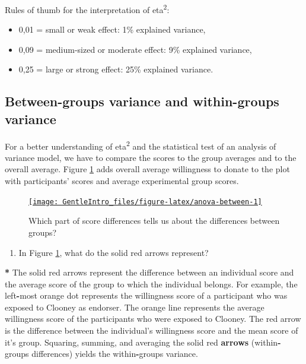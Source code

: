 \documentclass[a4paper]{book}
\newenvironment{Shaded}{\begin{snugshade}}{\end{snugshade}}
\newcommand{\KeywordTok}[1]{\textcolor[rgb]{0,0,0}{\textbf{#1}}}
\newcommand{\StringTok}[1]{\textcolor[rgb]{0.00,0.00,0.00}{#1}}
\newcommand{\OperatorTok}[1]{\textcolor[rgb]{0.00,0.00,0.00}{\textbf{#1}}}
\newcommand{\NormalTok}[1]{#1}
\providecommand{\tightlist}{%
  \setlength{\itemsep}{0pt}\setlength{\parskip}{0pt}}
\theoremstyle{definition}
\theoremstyle{definition}
\theoremstyle{definition}
\theoremstyle{remark}
\begin{document}
Rules of thumb for the interpretation of eta\textsuperscript{2}:

\begin{itemize}
\item
  0,01 = small or weak effect: 1\% explained variance,
\item
  0,09 = medium-sized or moderate effect: 9\% explained variance,
\item
  0,25 = large or strong effect: 25\% explained variance.
\end{itemize}

\subsection{Between-groups variance and within-groups
variance}\label{between-variance}

For a better understanding of eta\textsuperscript{2} and the statistical
test of an analysis of variance model, we have to compare the scores to
the group averages and to the overall average. Figure
\ref{fig:anova-between} adds overall average willingness to donate to
the plot with participants' scores and average experimental group
scores.

\begin{figure}[H]
\href{http://82.196.4.233:3838/apps/anova-between/}{\texttt{[image: GentleIntro\_files/figure-latex/anova-between-1]} }\caption{Which part of score differences tells us about the differences between groups?}\label{fig:anova-between}
\end{figure}

\begin{enumerate}
\def\labelenumi{\arabic{enumi}.}
\tightlist
\item
  In Figure \ref{fig:anova-between}, what do the solid red arrows
  represent?
\end{enumerate}

\begin{Shaded}
\begin{Highlighting}[]
\OperatorTok{*}\StringTok{ }\NormalTok{The solid red arrows represent the difference between an individual score}
\NormalTok{and the average score of the group to which the individual belongs. For}
\NormalTok{example, the left}\OperatorTok{-}\NormalTok{most orange dot represents the willingness score of a}
\NormalTok{participant who was exposed to Clooney as endorser. The orange line represents}
\NormalTok{the average willingness score of the participants who were exposed to Clooney.}
\NormalTok{The red arrow is the difference between the individual}\StringTok{'s willingness score and}
\StringTok{the mean score of it'}\NormalTok{s group. Squaring, summing, and averaging the solid red}
\KeywordTok{arrows}\NormalTok{ (within}\OperatorTok{-}\NormalTok{groups differences) yields the within}\OperatorTok{-}\NormalTok{groups variance.}
\end{Highlighting}
\end{Shaded}
\end{document}
